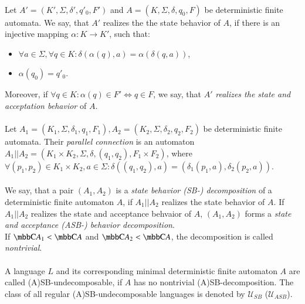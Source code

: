 \paragraph{}
 Let $A'=(K', \Sigma, \delta', q'_0, F')$ and $A=(K, \Sigma, \delta, q_0, F)$ be deterministic finite automata. We say, that $A'$ realizes the the state behavior of $A$, if there is an injective mapping $\alpha: K \rightarrow K'$, such that:

\begin{itemize}
\item $\forall a \in \Sigma, \forall q \in K: \delta(\alpha(q), a) = \alpha(\delta(q, a))$,
\item $\alpha(q_0) = q'_0$.
\end{itemize}

Moreover, if $\forall q \in K: \alpha(q)\in F' \Leftrightarrow q \in F$, we say, that $A'$ \emph{realizes the state and acceptation behavior} of $A$.

\paragraph{}
 Let $A_1=(K_1, \Sigma, \delta_1, q_1, F_1), A_2=(K_2, \Sigma, \delta_2, q_2, F_2)$ be deterministic finite automata. Their \emph{parallel connection} is an automaton $A_1 || A_2 = (K_1\times K_2, \Sigma, \delta, (q_1,q_2), F_1\times F_2)$, where $\forall (p_1,p_2) \in K_1\times K_2, a \in \Sigma: \delta((q_1,q_2), a) = (\delta_1(p_1, a), \delta_2(p_2,a))$.

\paragraph{}
 We say, that a pair $(A_1, A_2)$ is a \emph{state behavior (SB-) decomposition} of a deterministic finite automaton $A$, if $A_1 || A_2$ realizes the state behavior of $A$. If $A_1 || A_2$ realizes the state and acceptance behvaior of $A$, $(A_1,A_2)$ forms a \emph{state and acceptance (ASB-) behavior decomposition}.\\
If $\C{A_1} < \C{A}$ and $\C{A_2} < \C{A}$, the decomposition is called \emph{nontrivial}.

\paragraph{}
 A language $L$ and its corresponding minimal deterministic finite automaton $A$ are called (A)SB-undecomposable, if $A$ has no nontrivial (A)SB-decomposition. The class of all regular (A)SB-undecomposable languages is denoted by $\mathcal{U}_{SB}$ ($\mathcal{U}_{ASB}$).

\paragraph{}
